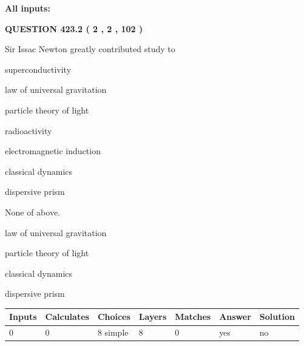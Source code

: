 \documentclass[12pt]{article}
\begin{document}
   
   
   
\noindent{}
   
   
   
   
\noindent\vspace{0.1in}\hspace{-0.08in} {\textbf{\Large{All inputs: }}}
   
   
  
\vspace{0.2in}
  
{\textbf{\Large{QUESTION
423.2 
 ( 2 , 2 , 102 )
}}}
  
  
Sir Issac Newton greatly contributed study to
 
 
superconductivity
 
 
law of universal gravitation
 
 
particle theory of light
 
 
radioactivity
 
 
electromagnetic induction
 
 
classical dynamics
 
 
dispersive prism
 
 
 None of above.
 
 
\noindent{}
 
 
law of universal gravitation
 
 
particle theory of light
 
 
classical dynamics
 
 
dispersive prism
 
 
\noindent{}
 
 
   
   
   
   
\noindent\begin{tabular}{|l|l|l|l|l|l|l|}
 \hline
Inputs & Calculates & Choices & Layers & Matches & Answer & Solution \\ \hline
 0  & 
 0  & 
 8
  simple  
  & 
 8  & 
 0  & 
  yes & 
  no 
  \\ \hline
 \end{tabular}
   
\end{document}
